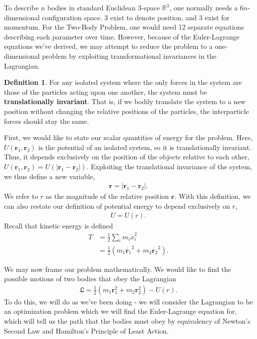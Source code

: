 \documentclass[10pt, psamsfonts]{amsart}
\theoremstyle{definition}
\newtheorem{defn}[thm]{Definition}
\theoremstyle{remark}
\numberwithin{equation}{section}
\begin{document}
To describe $n$ bodies in standard Euclidean 3-space $\mathbb{R}^3$, one normally needs a $6n$-dimensional configuration space. 3 exist to denote position, and 3 exist for momentum. For the Two-Body Problem, one would need 12 separate equations describing each parameter over time. However, because of the Euler-Lagrange equations we've derived, we may attempt to reduce the problem to a one-dimensional problem by exploiting transformational invariances in the Lagrangian.

\begin{defn}
  For any isolated system where the only forces in the system are those of the particles acting upon one another, the system must be \textbf{translationally invariant}. That is, if we bodily translate the system to a new position without changing the relative positions of the particles, the interparticle forces should stay the same.
\end{defn}

First, we would like to state our scalar quantities of energy for the problem. Here, $U(\bm{r}_1, \bm{r}_2)$ is the potential of an isolated system, so it is translationally invariant. Thus, it depends exclusively on the position of the objects relative to each other, $U(\bm{r}_1, \bm{r}_2) = U(|\bm{r}_1 - \bm{r}_2|) $. Exploiting the translational invariance of the system, we thus define a new variable,
\begin{align*}
  \bm{r} = |\bm{r}_1 - \bm{r}_2|.
\end{align*}
We refer to $r$ as the magnitude of the relative position $\bm{r}$. With this definition, we can also restate our definition of potential energy to depend exclusively on $r$,
\begin{align*}
  U = U(r).
\end{align*}
Recall that kinetic energy is defined 
\begin{align*}
  T &= \frac{1}{2} \sum_i  m_i \dot{x}_i^2 \\
    &= \frac{1}{2} (m_1 \dot{\bm{r}_1}^2 + m_2 \dot{\bm{r}_2}^2).
\end{align*}

We may now frame our problem mathematically. We would like to find the possible motions of two bodies that obey the Lagrangian
\begin{gather*}
  \mathfrak{L} = \frac{1}{2} (m_1 \bm{r}_1^2 + m_2 \bm{r}_2^2) - U(r).
\end{gather*}
To do this, we will do as we've been doing - we will consider the Lagrangian to be an optimization problem which we will find the Euler-Lagrange equation for, which will tell us the path that the bodies must obey by equivalency of Newton's Second Law and Hamilton's Principle of Least Action.
\end{document}

